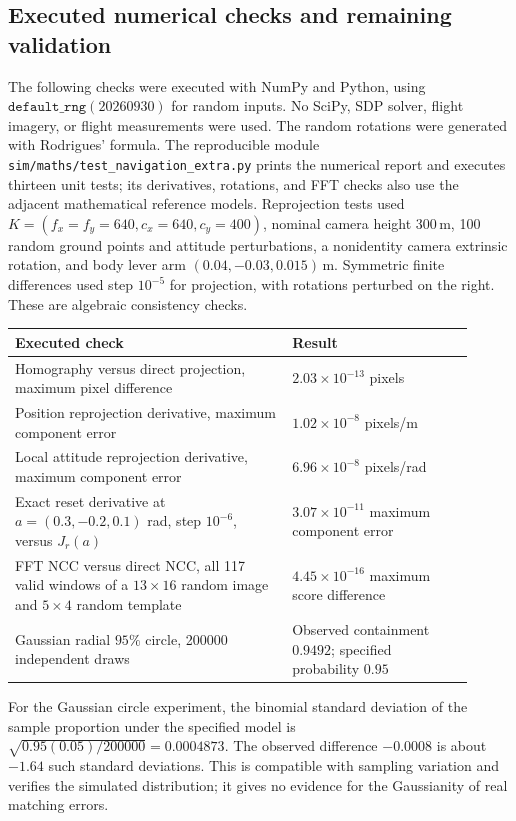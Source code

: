 \documentclass[11pt,a4paper]{article}
\numberwithin{equation}{section}
\begin{document}
\subsection{Executed numerical checks and remaining validation}

The following checks were executed with NumPy and Python, using
$\texttt{default\_rng}(20260930)$ for random inputs. No SciPy, SDP solver,
flight imagery, or flight measurements were used. The random rotations
were generated with Rodrigues' formula. The reproducible module
\texttt{sim/maths/test\_navigation\_extra.py} prints the numerical report
and executes thirteen unit tests; its derivatives, rotations, and FFT
checks also use the adjacent mathematical reference models. Reprojection tests used
$K=(f_x=f_y=640,c_x=640,c_y=400)$, nominal camera height $300\,\mathrm m$,
100 random ground points and attitude perturbations, a nonidentity
camera extrinsic rotation, and body lever arm $(0.04,-0.03,0.015)\,\mathrm m$.
Symmetric finite differences used step $10^{-5}$ for projection, with
rotations perturbed on the right. These are algebraic consistency checks.

\begin{center}
\begin{tabular}{@{}p{0.55\linewidth}p{0.36\linewidth}@{}}
\toprule
Executed check & Result\\
\midrule
Homography versus direct projection, maximum pixel difference
 & $2.03\times10^{-13}$ pixels\\
Position reprojection derivative, maximum component error
 & $1.02\times10^{-8}$ pixels/m\\
Local attitude reprojection derivative, maximum component error
 & $6.96\times10^{-8}$ pixels/rad\\
Exact reset derivative at $a=(0.3,-0.2,0.1)$ rad,
step $10^{-6}$, versus $J_r(a)$
 & $3.07\times10^{-11}$ maximum component error\\
FFT NCC versus direct NCC, all 117 valid windows of a
$13\times16$ random image and $5\times4$ random template
 & $4.45\times10^{-16}$ maximum score difference\\
Gaussian radial $95\%$ circle, 200000 independent draws
 & Observed containment $0.9492$; specified probability $0.95$\\
\bottomrule
\end{tabular}
\end{center}

For the Gaussian circle experiment, the binomial standard deviation of
the sample proportion under the specified model is
$\sqrt{0.95(0.05)/200000}=0.0004873$. The observed difference $-0.0008$
is about $-1.64$ such standard deviations. This is compatible with
sampling variation and verifies the simulated distribution; it gives
no evidence for the Gaussianity of real matching errors.
\end{document}
